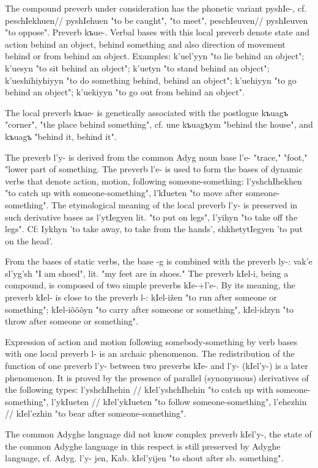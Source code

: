 \documentclass[a4paper,12pt]{book}
\newcommand{\1}[1]{\textbf{\emph{#1}}} %
\newcommand{\2}[1]{\textbf{[#1]}} %
\newcommand{\3}[1]{\fontsize{11pt}{0cm}\textbf{\emph{#1}}} %
\newcommand{\4}[1]{\fontsize{10pt}{0cm}\emph{#1}}	%
\newcommand{\5}[1]{\textbf{/#1/}} %
\newcommand{\6}[1]{\textbf{[#1]}} %
\newcommand{\7}[1]{\fontsize{12pt}{0cm}\emph{#1}} %
\newcommand{\8}[1]{\fontsize{12pt}{0cm}`#1'} %
\newcommand{\9}[1]{\fontsize{12pt}{0cm}(lit. `#1')} %
\begin{document}
The compound preverb under consideration has the phonetic variant pyshIe-, cf. peschIekhuen// pyshIehuen "to be caught", "to meet", peschIeuven// pyshIeuven "to oppose".
Preverb kъue-. Verbal bases with this local preverb denote state and action behind an object, behind something and also direction of movement behind or from behind an object. Examples: k'uel'yyn "to lie behind an object"; k'uesyn "to sit behind an object"; k'uetyn "to stand behind an object"; k'ueshihiyhiyyn "to do something behind, behind an object"; k'uehiyyn "to go behind an object"; k'uekiyyn "to go out from behind an object".

The local preverb kъue- is genetically associated with the postlogue kъuagъ "corner", "the place behind something", cf. une kъuagъym "behind the house", and kъuagъ "behind it, behind it".

The preverb l'y- is derived from the common Adyg noun base l'e- "trace," "foot," "lower part of something. The preverb l'e- is used to form the bases of dynamic verbs that denote action, motion, following someone-something: l'yshchIhekhen "to catch up with someone-something", l'kIueten "to move after someone-something".
The etymological meaning of the local preverb l'y- is preserved in such derivative bases as l'ytIegyen lit. "to put on legs", l'yihyn "to take off the legs". Cf: Iykhyn 'to take away, to take from the hands', shkhetytIegyen 'to put on the head'.

From the bases of static verbs, the base -g is combined with the preverb ly-: vak'e sl'yg'sh "I am shoed", lit. "my feet are in shoes."
The preverb kIel-i, being a compound, is composed of two simple preverbs kIe-+l'e-. By its meaning, the preverb kIel- is close to the preverb l-: kIel-ižen "to run after someone or something"; kIel-iõõõyn "to carry after someone or something", kIel-idzyn "to throw after someone or something".

Expression of action and motion following somebody-something by verb bases with one local preverb l- is an archaic phenomenon. The redistribution of the function of one preverb l'y- between two preverbs kIe- and l'y- (kIel'y-) is a later phenomenon. It is proved by the presence of parallel (synonymous) derivatives of the following types: l'yshchIhehin // kIel'yshchIhehin "to catch up with someone-something", l'ykIueten // kIel'ykIueten "to follow someone-something", l'ehezhin // kIel'ezhin "to bear after someone-something".

The common Adyghe language did not know complex preverb kIel'y-, the state of the common Adyghe language in this respect is still preserved by Adyghe language, cf. Adyg. l'y- jen, Kab. kIel'yijen "to shout after sb. something".
\end{document}

